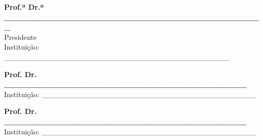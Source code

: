 \documentclass[
	12pt,				%
	oneside,			%
	a4paper,			%
	english,			%
	brazil				%
	]{abntex2ppgsi}
\begin{document}
\begin{folhadeaprovacao}
\begin{center}
%
% 
% 
%
% 
% 
% 
%
%
\textbf{Prof.ª Dr.ª \_\_\_\_\_\_\_\_\_\_\_\_\_\_\_\_\_\_\_\_\_\_\_\_\_\_\_\_\_\_\_\_\_\_\_\_\_\_\_\_\_\_} 
\\ Presidente 
\\ Instituição: \_\_\_\_\_\_\_\_\_\_\_\_\_\_\_\_\_\_\_\_\_\_\_\_\_\_\_\_\_\_\_\_\_\_\_\_\_\_\_\_\_\_ 

\vspace*{2cm}

\textbf{Prof. Dr. \_\_\_\_\_\_\_\_\_\_\_\_\_\_\_\_\_\_\_\_\_\_\_\_\_\_\_\_\_\_\_\_\_\_\_\_\_\_\_} 
\\ Instituição: \_\_\_\_\_\_\_\_\_\_\_\_\_\_\_\_\_\_\_\_\_\_\_\_\_\_\_\_\_\_\_\_\_\_\_\_\_\_\_\_

\vspace*{2cm}

\textbf{Prof. Dr. \_\_\_\_\_\_\_\_\_\_\_\_\_\_\_\_\_\_\_\_\_\_\_\_\_\_\_\_\_\_\_\_\_\_\_\_\_\_\_} 
\\ Instituição: \_\_\_\_\_\_\_\_\_\_\_\_\_\_\_\_\_\_\_\_\_\_\_\_\_\_\_\_\_\_\_\_\_\_\_\_\_\_\_\_

\end{center}
  
\end{folhadeaprovacao}

%
% 
\end{document}
